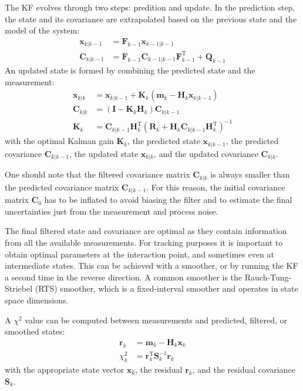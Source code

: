 The KF evolves through two steps: predition and update. In the prediction step, the state and its covariance are extrapolated based on the previous state and the model of the system:
\begin{align}
    \mathbf{x}_{k|k-1} &= \mathbf{F}_{k-1} \mathbf{x}_{k-1|k-1} \\
    \mathbf{C}_{k|k-1} &= \mathbf{F}_{k-1} \mathbf{C}_{k-1|k-1} \mathbf{F}_{k-1}^\mathrm{T} + \mathbf{Q}_{k-1}
\end{align}
An updated state is formed by combining the predicted state and the measurement:
\begin{align}
    \mathbf{x}_{k|k} &= \mathbf{x}_{k|k-1} + \mathbf{K}_k \left( \mathbf{m}_k - \mathbf{H}_k \mathbf{x}_{k|k-1} \right) \\
    \mathbf{C}_{k|k} &= \left( \mathbf{I} - \mathbf{K}_k \mathbf{H}_k \right) \mathbf{C}_{k|k-1} \\
    \mathbf{K}_k &= \mathbf{C}_{k|k-1} \mathbf{H}_k^\mathrm{T} \left( \mathbf{R}_k + \mathbf{H}_k \mathbf{C}_{k|k-1} \mathbf{H}_k^\mathrm{T} \right)^{-1}
\end{align}
with the optimal Kalman gain $\mathbf{K}_k$, the predicted state $\mathbf{x}_{k|k-1}$, the predicted covariance $\mathbf{C}_{k|k-1}$, the updated state $\mathbf{x}_{k|k}$, and the updated covariance $\mathbf{C}_{k|k}$.

One should note that the filtered covariance matrix $\mathbf{C}_{k|k}$ is always smaller than the predicted covariance matrix $\mathbf{C}_{k|k-1}$. For this reason, the initial covariance matrix $\mathbf{C}_0$ has to be inflated to avoid biasing the filter and to estimate the final uncertainties just from the measurement and process noise.

The final filtered state and covariance are optimal as they contain information from all the available measurements. For tracking purposes it is important to obtain optimal parameters at the interaction point, and sometimes even at intermediate states. This can be achieved with a smoother, or by running the KF a second time in the reverse direction. A common smoother is the Rauch-Tung-Striebel (RTS) smoother, which is a fixed-interval smoother and operates in state space dimensions.

A $\chi^2$ value can be computed between measurements and predicted, filtered, or smoothed states:
\begin{align}
    \mathbf{r}_k &= \mathbf{m}_k - \mathbf{H}_k \mathbf{x}_k \\
    \chi^2_k &= \mathbf{r}_k^\mathrm{T} \mathbf{S}_k^{-1} \mathbf{r}_k
\end{align}
with the appropriate state vector $\mathbf{x}_k$, the residual $\mathbf{r}_k$, and the residual covariance $\mathbf{S}_k$.

